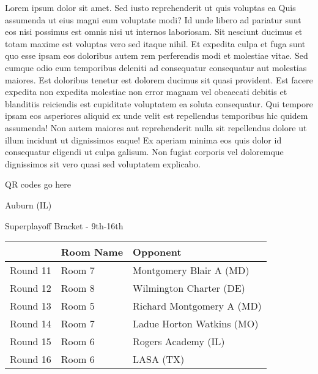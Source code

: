 \documentclass{article}%
\begin{document}
\vspace*{8pt}%
\linebreak%
\newline%
\newline%
    Lorem ipsum dolor sit amet. Sed iusto reprehenderit ut quis voluptas ea Quis assumenda ut eius magni eum voluptate modi? Id unde libero ad pariatur sunt eos nisi possimus est omnis nisi ut internos laboriosam. Sit nesciunt ducimus et totam maxime est voluptas vero sed itaque nihil. Et expedita culpa et fuga sunt quo esse ipsam eos doloribus autem rem perferendis modi et molestiae vitae.\newline%
\newline%
    Sed cumque odio eum temporibus deleniti ad consequatur consequatur aut molestias maiores. Est doloribus tenetur est dolorem ducimus sit quasi provident. Est facere expedita non expedita molestiae non error magnam vel obcaecati debitis et blanditiis reiciendis est cupiditate voluptatem ea soluta consequatur. Qui tempore ipsam eos asperiores aliquid ex unde velit est repellendus temporibus hic quidem assumenda!\newline%
\newline%
    Non autem maiores aut reprehenderit nulla sit repellendus dolore ut illum incidunt ut dignissimos eaque! Ex aperiam minima eos quis dolor id consequatur eligendi ut culpa galisum. Non fugiat corporis vel doloremque dignissimos sit vero quasi sed voluptatem explicabo.\newline%
\newline%
\vspace*{30pt}%
\begin{center}%
\begin{Huge}%
QR codes go here%
\end{Huge}%
\end{center}%
\newpage%
\begin{center}%
\begin{Huge}%
Auburn (IL)%
\end{Huge}%
\vspace*{8pt}%
\linebreak%
\begin{Large}%
Superplayoff Bracket {-} 9th{-}16th%
\end{Large}%
\end{center}%
%
\begin{tabularx}{\textwidth}{|c|Y|Y|}%
\hline%
&Room Name&Opponent\\%
\hline%
Round 11&Room 7&Montgomery Blair A (MD)\\%
Round 12&Room 8&Wilmington Charter (DE)\\%
Round 13&Room 5&Richard Montgomery A (MD)\\%
Round 14&Room 7&Ladue Horton Watkins (MO)\\%
Round 15&Room 6&Rogers Academy (IL)\\%
Round 16&Room 6&LASA (TX)\\%
\hline%
\end{tabularx}%
\end{document}
